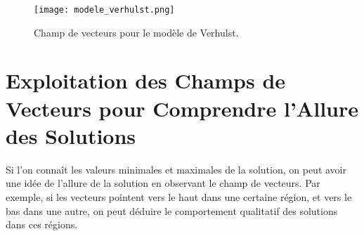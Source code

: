 \documentclass{article}
\begin{document}
\begin{figure}[H]
    \centering
    \texttt{[image: modele\_verhulst.png]}
    \caption{Champ de vecteurs pour le modèle de Verhulst.}
    \label{fig:modele_verhulst}
\end{figure}


\section{Exploitation des Champs de Vecteurs pour Comprendre l'Allure des Solutions}

Si l'on connaît les valeurs minimales et maximales de la solution, on peut avoir une idée de l'allure de la solution en observant le champ de vecteurs. Par exemple, si les vecteurs pointent vers le haut dans une certaine région, et vers le bas dans une autre, on peut déduire le comportement qualitatif des solutions dans ces régions.
\end{document}
